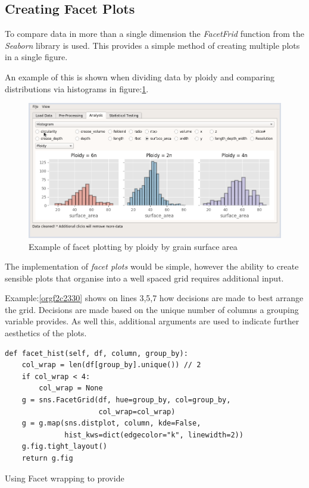 \documentclass[11pt]{report}
\begin{document}
\clearpage
\subsection{Creating Facet Plots}
\label{sec:org769779f}

To compare data in more than a single dimension the \emph{FacetFrid} function from the \emph{Seaborn} library is used. This provides a simple method of creating multiple plots in a single figure.

An example of this is shown when dividing data by ploidy and comparing distributions via histograms in figure:\ref{fig:org9ea5084}.

\begin{figure}[htbp]
\centering
\includegraphics[width=12cm]{./images/facet_example.png}
\caption{\label{fig:org9ea5084}
Example of facet plotting by ploidy by grain surface area}
\end{figure}

The implementation of \emph{facet plots} would be simple, however the ability to create sensible plots that organise into a well spaced grid requires additional input.

Example:\ref{orgf2c2330} shows on lines 3,5,7 how decisions are made to best arrange the grid. Decisions are made based on the unique number of columns a grouping variable provides. As well this,  additional arguments are  used to indicate further aesthetics of the plots.

\begin{listing}[htbp]
\begin{verbatim}
def facet_hist(self, df, column, group_by):
    col_wrap = len(df[group_by].unique()) // 2
    if col_wrap < 4:
        col_wrap = None
    g = sns.FacetGrid(df, hue=group_by, col=group_by,
                      col_wrap=col_wrap)
    g = g.map(sns.distplot, column, kde=False,
              hist_kws=dict(edgecolor="k", linewidth=2))
    g.fig.tight_layout()
    return g.fig
\end{verbatim}
\caption{\label{orgf2c2330}
Using Facet wrapping to provide}
\end{listing}
\end{document}
